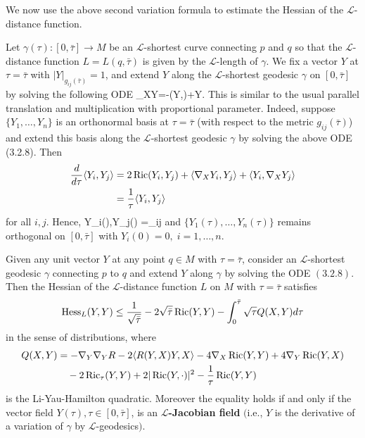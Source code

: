 We now use the above second variation formula to estimate the
Hessian of the $\mathcal{L}$-distance function.

Let $\gamma(\tau):[0,\bar{\tau}]\rightarrow M$ be an
$\mathcal{L}$-shortest curve connecting $p$ and $q$ so that the
$\mathcal{L}$-distance function $L=L(q,\bar\tau)$ is given by the
$\mathcal{L}$-length of $\gamma$. We fix a vector $Y$ at
$\tau=\bar{\tau}$ with $|Y|_{g_{ij}(\bar \tau)}=1$, and extend $Y$
along the $\mathcal{L}$-shortest geodesic $\gamma$ on
$[0,\bar{\tau}]$ by solving the following ODE \be
\nabla_XY=-\Ric(Y,\cdot)+Y.  %
\ee This is similar to the usual parallel translation and
multiplication with proportional parameter. Indeed, suppose
$\{Y_1,\ldots,Y_n\}$ is an orthonormal basis at $\tau=\bar{\tau}$
(with respect to the metric $g_{ij}(\bar \tau)$) and extend this
basis along the $\mathcal{L}$-shortest geodesic $\gamma$ by
solving the above ODE (3.2.8). Then
\begin{align*}
\frac{d}{d\tau}\langle Y_i,Y_j\rangle
&  = 2\operatorname{Ric}(Y_i,Y_j)+\langle\nabla_XY_i,Y_j\rangle+\langle Y_i,\nabla_XY_j\rangle\\
&  = \frac{1}{\tau}\langle Y_i,Y_j\rangle
\end{align*}
for all $i,j$. Hence, \be \<Y_i(\tau),Y_j(\tau)\>
=\frac{\tau}{\bar{\tau}}\delta_{ij}%
\ee and $\{Y_1(\tau),\ldots,Y_n(\tau)\}$ remains orthogonal on
$[0,\bar{\tau}]$ with $Y_i(0)=0,\;i=1,\ldots,n$.

\begin{proposition}
  \label{prop:cz-l-jacobi-comparison-inequality}
Given any unit vector $Y$ at any point $q \in M$ with
$\tau=\bar{\tau}$, consider an $\mathcal{L}$-shortest geodesic
$\gamma$ connecting $p$ to $q$ and extend $Y$ along $\gamma$ by
solving the {\rm ODE} $(3.2.8)$. Then the Hessian of the
$\mathcal{L}$-distance function $L$ on $M$ with $\tau=\bar{\tau}$
satisfies
$$
{\rm
Hess}_L(Y,Y)\leq\frac{1}{\sqrt{\bar{\tau}}}-2\sqrt{\bar{\tau}}\operatorname{Ric}(Y,Y)
-\int_0^{\bar{\tau}}\sqrt{{\tau}}Q(X,Y)d\tau
$$
in the sense of distributions, where
\begin{align*}
Q(X,Y)&  = -\nabla_Y\nabla_YR-2\langle R(Y,X)Y,X\rangle
-4\nabla_X \operatorname{Ric}(Y,Y)+4\nabla_Y \operatorname{Ric}(Y,X)\\
&\quad -2\operatorname{Ric}_\tau(Y,Y)+2|\operatorname{Ric}(Y,\cdot)|^2-\frac{1}{\tau}\operatorname{Ric}(Y,Y)
\end{align*}
is the Li-Yau-Hamilton quadratic. Moreover the equality holds if
and only if the vector field $Y(\tau),\tau\in[0,\bar{\tau}]$, is
an {\bf $\mathcal{L}$-Jacobian field} $($i.e., $Y$ is the
derivative of a variation of $\gamma$ by
$\mathcal{L}$-geodesics$)$.
\end{proposition}

